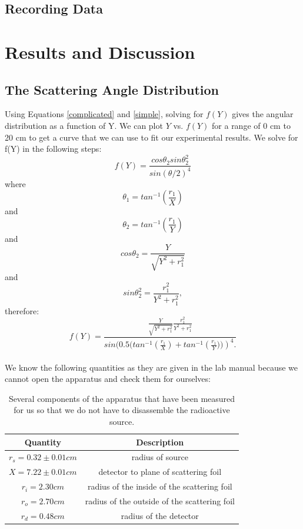\subsection{Recording Data}

\section{Results and Discussion}
\subsection{The Scattering Angle Distribution}
Using Equations \ref{complicated} and \ref{simple}, solving for $f(Y)$ gives the angular distribution as a function of Y. We can plot $Y$ vs. $f(Y)$ for a range of 0 cm to 20 cm to get a curve that we can use to fit our experimental results. We solve for f(Y) in the following steps:
\begin{equation} f(Y)=\frac{cos\theta_2 sin\theta_2^2}{sin(\theta/2)^4} \end{equation} where
\begin{equation} \theta_1=tan^{-1}\left(\frac{r_1}{X}\right)\end{equation} and
\begin{equation} \theta_2=tan^{-1}\left(\frac{r_1}{Y}\right)\end{equation} and
\begin{equation} cos\theta_2=\frac{Y}{\sqrt{Y^2+r_1^2}} \end{equation} and
\begin{equation} sin\theta_2^2=\frac{r_1^2}{Y^2+r_1^2}, \end{equation} therefore:
\begin{equation} f(Y)= \frac{\frac{Y}{\sqrt{Y^2+r_1^2}} \frac{r_1^2}{Y^2+r_1^2}}{sin(0.5(tan^{-1}\left(\frac{r_1}{X}\right) + tan^{-1}\left(\frac{r_1}{Y}))\right)^4.} \end{equation}\\
We know the following quantities as they are given in the lab manual because we cannot open the apparatus and check them for ourselves:
\begin{table}[H]
\begin{center}
\begin{tabular}{|c|c|}\hline
Quantity & Description \\ \hline 
$r_s=0.32\pm0.01cm$ & radius of source\\ \hline 
$X=7.22\pm0.01cm$ & detector to plane of scattering foil\\ \hline
$r_i=2.30cm$ & radius of the inside of the scattering foil\\ \hline
$r_o=2.70cm$ & radius of the outside of the scattering foil\\ \hline
$r_d=0.48cm$ & radius of the detector\\ \hline
\end{tabular}
\caption{Several components of the apparatus that have been measured for us so that we do not have to disassemble the radioactive source.}
\end{center}
\end{table}
